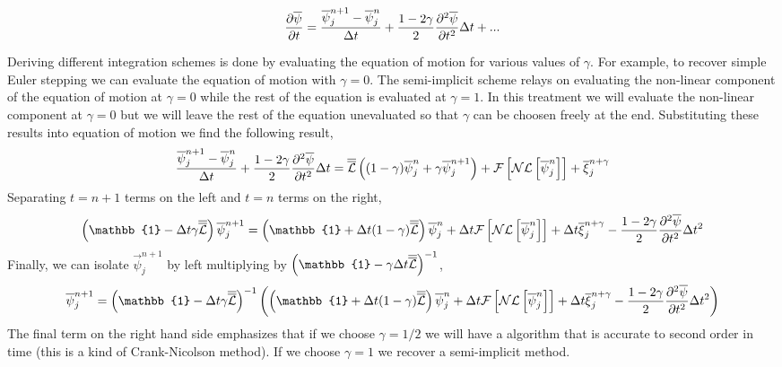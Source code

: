 \begin{equation}
	\frac{\partial \overline{\psi}}{\partial t} = 
        \frac{\overline{\psi}_j^{n+1} 
      - \overline{\psi}_j^n}{\Delta t} 
      + \frac{1 - 2 \gamma}{2}\frac{\partial^2 \overline{\psi}}{\partial t^2} \Delta t + ...
\end{equation}

Deriving different integration schemes is done by evaluating the equation of
motion for various values of $\gamma$. For example, to recover simple Euler
stepping we can evaluate the equation of motion with $\gamma = 0$. The
semi-implicit scheme relays on evaluating the non-linear component of the
equation of motion at $\gamma = 0$ while the rest of the equation is evaluated
at $\gamma = 1$. In this treatment we will evaluate the non-linear component at
$\gamma = 0$ but we will leave the rest of the equation unevaluated so that
$\gamma$ can be choosen freely at the end. Substituting these results into
equation of motion we find the following result, 
%
\begin{equation}
	  \frac{\overline{\psi}_j^{n + 1} 
    - \overline{\psi}_j^{n}}{\Delta t}
    + \frac{1 - 2\gamma}{2} \frac{\partial^2 \overline{\psi}}{\partial t^2}\Delta t 
        = 
       \overline{\overline{\mathcal{L}}} \left( (1 - \gamma) \overline{\psi}_j^n  
        + \gamma \overline{\psi}_j^{n+1} \right) 
     + \mathcal{F}\left[\mathcal{NL}\left[ \overline{\psi}_j^{n}\right]\right] 
     + \overline{\xi}_j^{n + \gamma}
\end{equation}
%
Separating $t=n+1$ terms on the left and $t=n$ terms on the right, 
%
\begin{equation}
	\left(\mathbb{1} - \Delta t  \gamma \tn{\mathcal{L}}\right) \vec{\psi}_j^{n + 1} 
		= \left(\mathbb{1} + \Delta t (1 - \gamma) \tn{\mathcal{L}}\right) \vec{\psi}_j^n 
		+ \Delta t \mathcal{F}\left[\mathcal{NL}\left[\vec{\psi}_j^n\right]\right] 
		+ \Delta t \vec{\xi}_j^{n + \gamma} 
		- \f{1 - 2\gamma}{2}\f{\partial^2 \vec{\psi}}{\partial t^2}\Delta t^2
\end{equation} 
%
Finally, we can isolate $\vec{\psi}_j^{n +1}$ by left multiplying by
$\left(\mathbb{1} - \gamma \Delta t \tn{\mathcal{L}}\right)^{-1}$, 
%
\begin{equation}
	\vec{\psi}_j^{n + 1} 
		=  \left(\mathbb{1} - \Delta t  \gamma \tn{\mathcal{L}}\right)^{-1} \left(
			\left(\mathbb{1} + \Delta t (1 - \gamma) \tn{\mathcal{L}}\right) \vec{\psi}_j^n 
			+ \Delta t \mathcal{F}\left[\mathcal{NL}\left[\vec{\psi}_j^n\right]\right] 
			+ \Delta t \vec{\xi}_j^{n + \gamma} 
			- \f{1 - 2\gamma}{2}\f{\partial^2 \vec{\psi}}{\partial t^2}\Delta t^2 
		\right)
\end{equation}
%
The final term on the right hand side emphasizes that if we choose $\gamma =
1/2$ we will have a algorithm that is accurate to second order in time (this is
a kind of Crank-Nicolson method). If we choose $\gamma = 1$ we recover a
semi-implicit method. 

